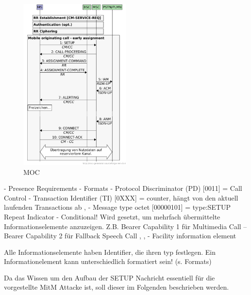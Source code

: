 \begin{figure}[H]
  \begin{center}
    \includegraphics[width=0.5\textwidth]{figures/gsm_mobile_orig_call.pdf}
  \end{center}
  \caption[\ac{MOC}]{\ac{MOC}} \label{fig:moc}
\end{figure}

 - Presence Requirements
 - Formats
 - Protocol Discriminator (PD) [0011] = Call Control
 - Transaction Identifier (TI) [0XXX] = counter, hängt von den aktuell laufenden Transactions ab
,  - Message type octet [00000101] = type:SETUP 
 Repeat Indicator - Conditional! Wird gesetzt, um mehrfach übermittelte Informationselemente anzuzeigen. Z.B. Bearer Capability 1 für Multimedia Call -- Bearer Capability 2 für Fallback Speech Call
, , 
 - Facility information element

Alle Informationselemente haben Identifier, die ihren typ festlegen. Ein Informationelement kann unterschiedlich formatiert sein! (s. Formats) 


Da das Wissen um den Aufbau der SETUP Nachricht essentiell für die vorgestellte \ac{MitM} Attacke ist, soll dieser im Folgenden beschrieben werden. 

